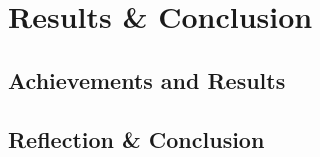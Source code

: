 \chapter{Results \& Conclusion}\label{ch:results-&-conclusion}
\section{Achievements and Results}
\lipsum[7-9]
\section{Reflection \& Conclusion}
\lipsum[10-13]